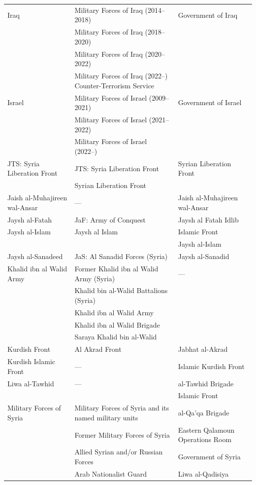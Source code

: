 \begin{longtable}{@{}>{\raggedright\arraybackslash}p{3.15cm} >{\raggedright\arraybackslash}p{6.15cm} >{\raggedright\arraybackslash}p{6.15cm}@{}}
\hline
Iraq & Military Forces of Iraq (2014--2018) & Government of Iraq \\
 & Military Forces of Iraq (2018--2020) &  \\
 & Military Forces of Iraq (2020--2022) &  \\
 & Military Forces of Iraq (2022--) Counter-Terrorism Service &  \\
\hline
Israel & Military Forces of Israel (2009--2021) & Government of Israel \\
 & Military Forces of Israel (2021--2022) &  \\
 & Military Forces of Israel (2022--) &  \\
\hline
JTS: Syria Liberation Front & JTS: Syria Liberation Front & Syrian Liberation Front \\
 & Syrian Liberation Front &  \\
\hline
Jaish al-Muhajireen wal-Ansar & --- & Jaish al-Muhajireen wal-Ansar \\
\hline
Jaysh al-Fatah & JaF: Army of Conquest & Jaysh al Fatah Idlib \\
\hline
Jaysh al-Islam & Jaysh al Islam & Islamic Front \\
 &  & Jaysh al-Islam \\
\hline
Jaysh al-Sanadeed & JaS: Al Sanadid Forces (Syria) & Jaysh al-Sanadid \\
\hline
Khalid ibn al Walid Army & Former Khalid ibn al Walid Army (Syria) & --- \\
 & Khalid bin al-Walid Battalions (Syria) &  \\
 & Khalid ibn al Walid Army &  \\
 & Khalid ibn al Walid Brigade &  \\
 & Saraya Khalid bin al-Walid &  \\
\hline
Kurdish Front & Al Akrad Front & Jabhat al-Akrad \\
\hline
Kurdish Islamic Front & --- & Islamic Kurdish Front \\
\hline
Liwa al-Tawhid & --- & al-Tawhid Brigade \\
 &  & Islamic Front \\
\hline
Military Forces of Syria & Military Forces of Syria and its named military units & al-Qa'qa Brigade \\
 & Former Military Forces of Syria & Eastern Qalamoun Operations Room \\
 & Allied Syrian and/or Russian Forces & Government of Syria \\
 & Arab Nationalist Guard & Liwa al-Qadisiya \\

\end{longtable}

